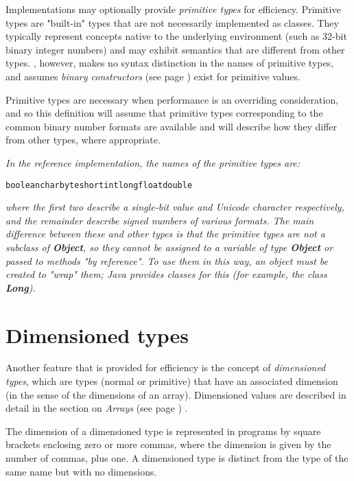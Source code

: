 Implementations may optionally provide \emph{primitive types} for
efficiency.
Primitive types are "built-in" types that are not necessarily
implemented as classes.
They typically represent concepts native to the underlying environment
(such as 32-bit binary integer numbers) and may exhibit semantics that
are different from other types.  \nr{}, however, makes no syntax
distinction in the names of primitive types, and assumes
 \emph{binary constructors} (see page \pageref{refbincon})  exist for primitive
values.
 
Primitive types are necessary when performance is an overriding
consideration, and so this definition will assume that primitive types
corresponding to the common binary number formats are available and will
describe how they differ from other types, where appropriate.
 
\emph{In the reference implementation, the names of the primitive types
are:}
\begin{alltt}
boolean char byte short int long float double
\end{alltt}
\emph{where the first two describe a single-bit value and Unicode
character respectively, and the remainder describe signed numbers of
various formats.
The main difference between these and other types is that the primitive
types are not a subclass of \textbf{Object}, so they cannot be
assigned to a variable of type \textbf{Object} or passed to methods
"by reference".  To use them in this way, an object must be created
to "wrap" them; Java provides classes for this (for example, the
class \textbf{Long}).
}
\section{Dimensioned types}\label{refdimtype}
 
Another feature that is provided for efficiency is the concept of
\emph{dimensioned types}, which are types (normal or primitive) that
have an associated dimension (in the sense of the dimensions of an
array).  Dimensioned values are described in detail in the section on
 \emph{Arrays} (see page \pageref{refarray}) .
 
The dimension of a dimensioned type is represented in \nr{} programs
by square brackets enclosing zero or more commas, where the dimension is
given by the number of commas, plus one.  A dimensioned type is distinct
from the type of the same name but with no dimensions.

